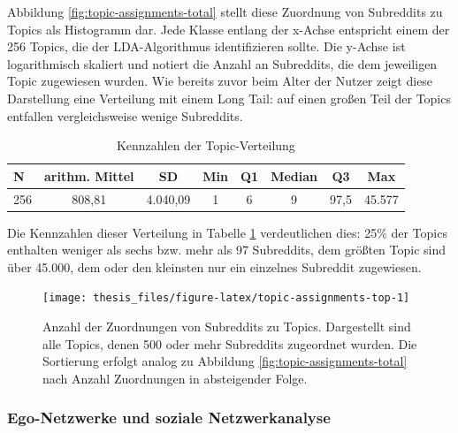 \documentclass[11pt,a4paper,twoside]{article}
\begin{document}
Abbildung \ref{fig:topic-assignments-total} stellt diese Zuordnung von
Subreddits zu Topics als Histogramm dar. Jede Klasse entlang der x-Achse
entspricht einem der 256 Topics, die der LDA-Algorithmus identifizieren
sollte. Die y-Achse ist logarithmisch skaliert und notiert die Anzahl an
Subreddits, die dem jeweiligen Topic zugewiesen wurden. Wie bereits
zuvor beim Alter der Nutzer zeigt diese Darstellung eine Verteilung mit
einem Long Tail: auf einen großen Teil der Topics entfallen
vergleichsweise wenige Subreddits.



\begin{table}

\caption{\label{tab:topic-assignments-summary}Kennzahlen der Topic-Verteilung}
\centering
\begin{tabular}[t]{lccccccc}
\toprule
N & arithm. Mittel & SD & Min & Q1 & Median & Q3 & Max\\
\midrule
256 & 808,81 & 4.040,09 & 1 & 6 & 9 & 97,5 & 45.577\\
\bottomrule
\end{tabular}
\end{table}

Die Kennzahlen dieser Verteilung in Tabelle
\ref{tab:topic-assignments-summary} verdeutlichen dies: 25\% der Topics
enthalten weniger als sechs bzw. mehr als 97 Subreddits, dem größten
Topic sind über 45.000, dem oder den kleinsten nur ein einzelnes
Subreddit zugewiesen.







\begin{figure}

{\centering \texttt{[image: thesis\_files/figure-latex/topic-assignments-top-1]} 

}

\caption{Anzahl der Zuordnungen von Subreddits zu
Topics. Dargestellt sind alle Topics, denen 500 oder mehr Subreddits
zugeordnet wurden. Die Sortierung erfolgt analog zu Abbildung
\ref{fig:topic-assignments-total} nach Anzahl Zuordnungen in
absteigender Folge.}\label{fig:topic-assignments-top}
\end{figure}

\hypertarget{ego-netzwerke-und-soziale-netzwerkanalyse}{%
\subsubsection{Ego-Netzwerke und soziale
Netzwerkanalyse}\label{ego-netzwerke-und-soziale-netzwerkanalyse}}
\end{document}
